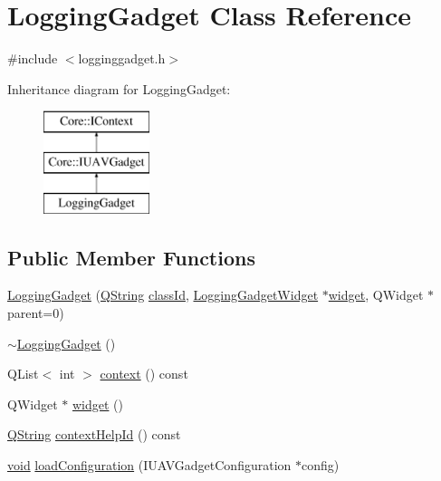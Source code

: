 \hypertarget{class_logging_gadget}{\section{\-Logging\-Gadget \-Class \-Reference}
\label{class_logging_gadget}
}


{\ttfamily \#include $<$logginggadget.\-h$>$}

\-Inheritance diagram for \-Logging\-Gadget\-:\begin{figure}[H]
\begin{center}
\leavevmode
\includegraphics[height=3.000000cm]{class_logging_gadget}
\end{center}
\end{figure}
\subsection*{\-Public \-Member \-Functions}
\begin{DoxyCompactItemize}
\item 
\hyperlink{group___g_c_s_control_gadget_plugin_gaf04a39f8faf77df7657801a58bf39bf9}{\-Logging\-Gadget} (\hyperlink{group___u_a_v_objects_plugin_gab9d252f49c333c94a72f97ce3105a32d}{\-Q\-String} \hyperlink{group___core_plugin_ga3878fde66a57220608960bcc3fbeef2c}{class\-Id}, \hyperlink{class_logging_gadget_widget}{\-Logging\-Gadget\-Widget} $\ast$\hyperlink{group___g_c_s_control_gadget_plugin_gaaa54cb505c0bcf94b159b6fb51cea991}{widget}, \-Q\-Widget $\ast$parent=0)
\item 
\hyperlink{group___g_c_s_control_gadget_plugin_gabcd5577c6960598473ac23935c47c958}{$\sim$\-Logging\-Gadget} ()
\item 
\-Q\-List$<$ int $>$ \hyperlink{group___g_c_s_control_gadget_plugin_gadceb403447b87bafeda8fad2855d01bf}{context} () const 
\item 
\-Q\-Widget $\ast$ \hyperlink{group___g_c_s_control_gadget_plugin_gaaa54cb505c0bcf94b159b6fb51cea991}{widget} ()
\item 
\hyperlink{group___u_a_v_objects_plugin_gab9d252f49c333c94a72f97ce3105a32d}{\-Q\-String} \hyperlink{group___g_c_s_control_gadget_plugin_gaf63d806b2f5ac3cdf4c71fe9a241f7a8}{context\-Help\-Id} () const 
\item 
\hyperlink{group___u_a_v_objects_plugin_ga444cf2ff3f0ecbe028adce838d373f5c}{void} \hyperlink{group___g_c_s_control_gadget_plugin_ga7e66a1250e46435b2c92ff170afafeec}{load\-Configuration} (\-I\-U\-A\-V\-Gadget\-Configuration $\ast$config)
\end{DoxyCompactItemize}


